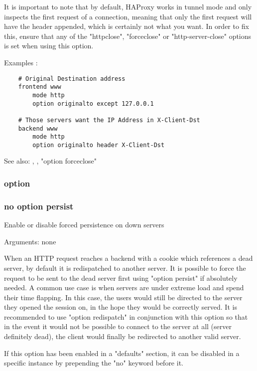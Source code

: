 {  It is important to note that by default, HAProxy works in tunnel mode and
  only inspects the first request of a connection, meaning that only the first
  request will have the header appended, which is certainly not what you want.
  In order to fix this, ensure that any of the "httpclose", "forceclose" or
  "http-server-close" options is set when using this option.

  Examples :
\begin{verbatim}
    # Original Destination address
    frontend www
        mode http
        option originalto except 127.0.0.1

    # Those servers want the IP Address in X-Client-Dst
    backend www
        mode http
        option originalto header X-Client-Dst
\end{verbatim}

  See also: , ,
             "option forceclose"

\subsubsection[persist]{option }
\subsubsection*{no option persist}


  Enable or disable forced persistence on down servers


  Arguments: none

  When an HTTP request reaches a backend with a cookie which references a dead
  server, by default it is redispatched to another server. It is possible to
  force the request to be sent to the dead server first using "option persist"
  if absolutely needed. A common use case is when servers are under extreme
  load and spend their time flapping. In this case, the users would still be
  directed to the server they opened the session on, in the hope they would be
  correctly served. It is recommended to use "option redispatch" in conjunction
  with this option so that in the event it would not be possible to connect to
  the server at all (server definitely dead), the client would finally be
  redirected to another valid server.

  If this option has been enabled in a "defaults" section, it can be disabled
  in a specific instance by prepending the "no" keyword before it.

}
